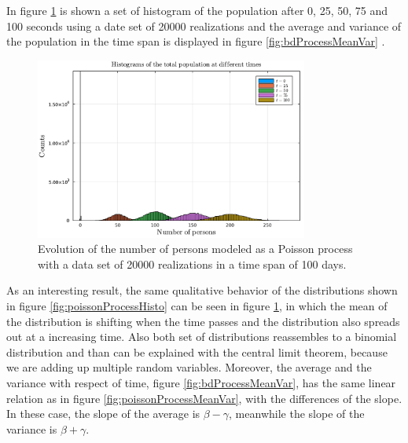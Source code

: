 \documentclass[main.tex]{subfiles}
\begin{document}
In figure \ref{fig:bdProcessHisto} is shown a set of histogram of the population after 0, 25, 50, 75 and 100 seconds using a date set of \num{20000} realizations and the average and variance of the population in the time span is displayed in figure \ref{fig:bdProcessMeanVar} .

\begin{figure}[ht!]
    \centering
    \includegraphics[width=0.8\textwidth]{imgs/hw5/bdProcessHistograms.pdf}
    \caption{Evolution of the number of persons modeled as a Poisson process with a data set of \num{20000} realizations in a time span of 100 days. }
    \label{fig:bdProcessHisto}
\end{figure}

As an interesting result, the same qualitative behavior of the distributions shown in figure \ref{fig:poissonProcessHisto} can be seen in figure \ref{fig:bdProcessHisto}, in which the mean of the distribution is shifting when the time passes and the distribution also spreads out at a increasing time.
Also both set of distributions reassembles to a binomial distribution and than can be explained with the central limit theorem, because we are adding up multiple random variables.
Moreover, the average and the variance with respect of time, figure \ref{fig:bdProcessMeanVar}, has the same linear relation as in figure \ref{fig:poissonProcessMeanVar}, with the differences of the slope.
In these case, the slope of the average is $\beta-\gamma$, meanwhile the slope of the variance is $\beta+\gamma$.
\end{document}
